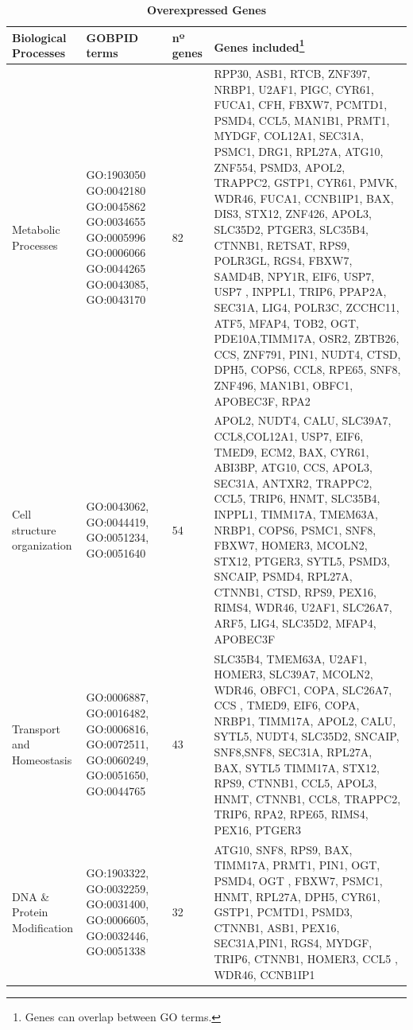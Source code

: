 \documentclass[9pt,twocolumn,twoside]{gsajnl}
\begin{document}
\pagebreak
 

\begin{table}[htbp]
\centering
\caption{\bf Overexpressed Genes}
\begin{tableminipage}{\textwidth}
\begin{tabularx}{\textwidth}{m{3cm}m{3.5cm}m{1.2cm}m{9.2cm}}
\hline
Biological Processes & GOBPID terms & nº genes & Genes included\footnote{Genes can overlap between GO terms.} \\
\hline

Metabolic Processes & GO:1903050  GO:0042180  GO:0045862  GO:0034655  GO:0005996  GO:0006066  GO:0044265  GO:0043085, GO:0043170 & 82 &  RPP30, ASB1, RTCB, ZNF397, NRBP1, U2AF1, PIGC,  CYR61,  FUCA1, CFH, FBXW7, PCMTD1, PSMD4, CCL5, MAN1B1, PRMT1, MYDGF, COL12A1, SEC31A, PSMC1, DRG1, RPL27A, ATG10, ZNF554, PSMD3, APOL2, TRAPPC2, GSTP1, CYR61,  PMVK, WDR46, FUCA1, CCNB1IP1, BAX, DIS3, STX12, ZNF426, APOL3, SLC35D2, PTGER3, SLC35B4, CTNNB1, RETSAT, RPS9, POLR3GL, RGS4,  FBXW7, SAMD4B, NPY1R, EIF6, USP7, USP7 , INPPL1, TRIP6, PPAP2A,  SEC31A, LIG4, POLR3C, ZCCHC11, ATF5, MFAP4, TOB2, OGT,  PDE10A,TIMM17A, OSR2, ZBTB26, CCS, ZNF791, PIN1, NUDT4, CTSD, DPH5, COPS6, CCL8, RPE65, SNF8, ZNF496,  MAN1B1, OBFC1, APOBEC3F, RPA2\\

Cell structure organization & GO:0043062, GO:0044419, GO:0051234, GO:0051640 & 54 & APOL2, NUDT4, CALU, SLC39A7, CCL8,COL12A1, USP7, EIF6, TMED9, ECM2, BAX, CYR61, ABI3BP, ATG10, CCS, APOL3, SEC31A, ANTXR2, TRAPPC2, CCL5, TRIP6, HNMT, SLC35B4, INPPL1, TIMM17A, TMEM63A, NRBP1, COPS6, PSMC1, SNF8, FBXW7, HOMER3, MCOLN2, STX12, PTGER3, SYTL5, PSMD3, SNCAIP, PSMD4, RPL27A, CTNNB1, CTSD, RPS9, PEX16, RIMS4, WDR46, U2AF1, SLC26A7, ARF5, LIG4, SLC35D2, MFAP4, APOBEC3F\\

Transport and Homeostasis & GO:0006887, GO:0016482, GO:0006816, GO:0072511, GO:0060249,  GO:0051650, GO:0044765 & 43 & SLC35B4, TMEM63A, U2AF1, HOMER3, SLC39A7, MCOLN2, WDR46, OBFC1,  COPA, SLC26A7, CCS  , TMED9, EIF6, COPA, NRBP1, TIMM17A, APOL2, CALU, SYTL5, NUDT4, SLC35D2, SNCAIP, SNF8,SNF8, SEC31A, RPL27A, BAX, SYTL5  TIMM17A, STX12, RPS9, CTNNB1, CCL5, APOL3, HNMT,  CTNNB1, CCL8, TRAPPC2, TRIP6, RPA2, RPE65, RIMS4, PEX16, PTGER3\\

DNA \& Protein Modification & GO:1903322, GO:0032259, GO:0031400, GO:0006605, GO:0032446, GO:0051338 & 32 & ATG10, SNF8, RPS9, BAX, TIMM17A, PRMT1, PIN1, OGT, PSMD4, OGT , FBXW7, PSMC1, HNMT, RPL27A, DPH5, CYR61, GSTP1,  PCMTD1, PSMD3,  CTNNB1, ASB1, PEX16,  SEC31A,PIN1, RGS4, MYDGF, TRIP6, CTNNB1, HOMER3, CCL5 , WDR46, CCNB1IP1\\


\end{tabularx}
\end{tableminipage}
\end{table}
\end{document}
